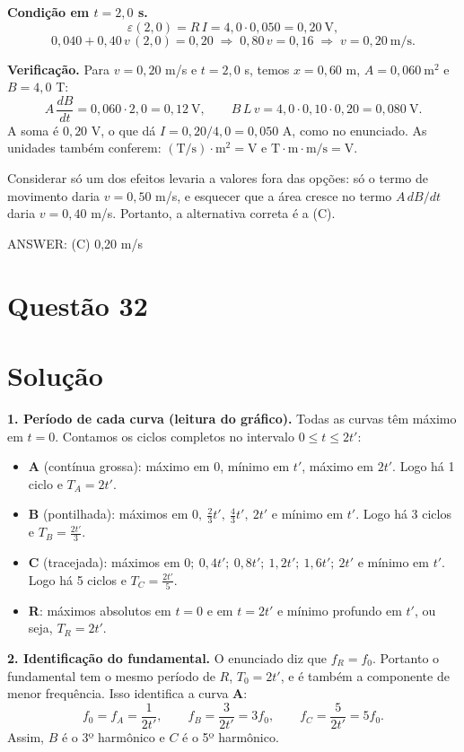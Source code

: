 \documentclass{article}%
\begin{document}
\textbf{Condição em $t=2{,}0$ s.}
\[
\varepsilon(2{,}0)=R\,I=4{,}0\cdot 0{,}050=0{,}20\ \text{V},
\]
\[
0{,}040+0{,}40\,v\,(2{,}0)=0{,}20 \;\Rightarrow\; 0{,}80\,v=0{,}16 \;\Rightarrow\; v=0{,}20\ \text{m/s}.
\]

\textbf{Verificação.} Para $v=0{,}20$ m/s e $t=2{,}0$ s, temos $x=0{,}60$ m, $A=0{,}060\ \text{m}^2$ e $B=4{,}0$ T:
\[
A\,\frac{dB}{dt}=0{,}060\cdot 2{,}0=0{,}12\ \text{V},\qquad B\,L\,v=4{,}0\cdot 0{,}10\cdot 0{,}20=0{,}080\ \text{V}.
\]
A soma é $0{,}20$ V, o que dá $I=0{,}20/4{,}0=0{,}050$ A, como no enunciado. As unidades também conferem: $(\text{T/s})\cdot\text{m}^2=\text{V}$ e $\text{T}\cdot\text{m}\cdot\text{m/s}=\text{V}$.

Considerar só um dos efeitos levaria a valores fora das opções: só o termo de movimento daria $v=0{,}50$ m/s, e esquecer que a área cresce no termo $A\,dB/dt$ daria $v=0{,}40$ m/s. Portanto, a alternativa correta é a (C).

ANSWER: (C) 0,20 m/s%
\newpage%
\section*{Questão 32}

\section*{Solução}

\textbf{1. Período de cada curva (leitura do gráfico).} Todas as curvas têm máximo em $t=0$. Contamos os ciclos completos no intervalo $0\le t\le 2t'$:

\begin{itemize}
\item \textbf{A} (contínua grossa): máximo em $0$, mínimo em $t'$, máximo em $2t'$. Logo há 1 ciclo e $T_A=2t'$.
\item \textbf{B} (pontilhada): máximos em $0,\ \tfrac{2}{3}t',\ \tfrac{4}{3}t',\ 2t'$ e mínimo em $t'$. Logo há 3 ciclos e $T_B=\tfrac{2t'}{3}$.
\item \textbf{C} (tracejada): máximos em $0;\ 0{,}4t';\ 0{,}8t';\ 1{,}2t';\ 1{,}6t';\ 2t'$ e mínimo em $t'$. Logo há 5 ciclos e $T_C=\tfrac{2t'}{5}$.
\item \textbf{R}: máximos absolutos em $t=0$ e em $t=2t'$ e mínimo profundo em $t'$, ou seja, $T_R=2t'$.
\end{itemize}

\textbf{2. Identificação do fundamental.} O enunciado diz que $f_R=f_0$. Portanto o fundamental tem o mesmo período de $R$, $T_0=2t'$, e é também a componente de menor frequência. Isso identifica a curva \textbf{A}:
\[
f_0=f_A=\frac{1}{2t'},\qquad f_B=\frac{3}{2t'}=3f_0,\qquad f_C=\frac{5}{2t'}=5f_0 .
\]
Assim, $B$ é o 3º harmônico e $C$ é o 5º harmônico.
\end{document}
